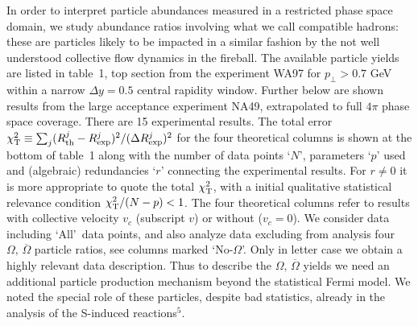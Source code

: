 \begin{mdframed}[linecolor=gray,roundcorner=12pt,backgroundcolor=Dandelion!15,linewidth=1pt,leftmargin=0cm,rightmargin=0cm,topline=true,bottomline=true,skipabove=12pt]
In order to interpret particle abundances measured in a restricted phase space domain, we study abundance ratios involving what we call compatible hadrons: these are particles likely to be impacted in a similar fashion by the not well understood collective flow dynamics in the fireball. The available particle yields are listed in table~1, top section from the experiment WA97 for $p_\bot>0.7$ GeV within a narrow $\Delta y=0.5$ central rapidity window. Further below are shown results from the large acceptance experiment NA49, extrapolated to full $4\pi$ phase space coverage. There are 15 experimental results. The total error $\chi^2_{\rm T}\equiv\sum_j({R_{\rm th}^j-R_{\rm exp}^j})^2/ ({{\Delta R _{\rm exp}^j}})^2$ for the four theoretical columns is shown at the bottom of table~1 along with the number of data points `$N$', parameters `$p$' used and (algebraic) redundancies `$r$' connecting the experimental results. For $r\ne 0$ it is more appropriate to quote the total $\chi^2_{\rm T}$, with a initial qualitative statistical relevance condition $\chi^2_{\rm T}/(N-p)<1$. The four theoretical columns refer to results with collective velocity $v_c$ (subscript $v$) or without ($v_c=0$). We consider data including \lq All\rq\ data points, and also analyze data excluding from analysis four $\Omega,\,\overline\Omega$ particle ratios, see columns marked \lq No-$\Omega$\rq. Only in letter case we obtain a highly relevant data description. Thus to describe the $\Omega,\,\overline{\Omega}$ yields we need an additional particle production mechanism beyond the statistical Fermi model. We noted the special role of these particles, despite bad statistics, already in the analysis of the S-induced reactions$^5$.\\


\end{mdframed}
